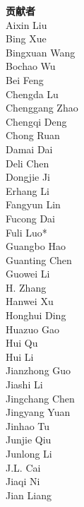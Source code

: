 \documentclass[11pt, a4paper, logo, copyright, nonumbering]{deepseek}
\begin{document}
\begin{multicols}{2}
\noindent
\textbf{\color{damaiblue} 贡献者} \\
\color{damaiblue}
\color{damaiblue} Aixin Liu \\
\color{damaiblue} Bing Xue \\
\color{damaiblue} Bingxuan Wang \\
\color{damaiblue} Bochao Wu \\
\color{damaiblue} Bei Feng \\
\color{damaiblue} Chengda Lu \\
\color{damaiblue} Chenggang Zhao \\
\color{damaiblue} Chengqi Deng \\
\color{damaiblue} Chong Ruan \\
\color{damaiblue} Damai Dai \\
\color{damaiblue} Deli Chen \\
\color{damaiblue} Dongjie Ji \\
\color{damaiblue} Erhang Li \\
\color{damaiblue} Fangyun Lin \\
\color{damaiblue} Fucong Dai \\
\color{damaiblue} Fuli Luo* \\
\color{damaiblue} Guangbo Hao \\
\color{damaiblue} Guanting Chen \\
\color{damaiblue} Guowei Li \\
\color{damaiblue} H. Zhang \\
\color{damaiblue} Hanwei Xu \\
\color{damaiblue} Honghui Ding \\
\color{damaiblue} Huazuo Gao \\
\color{damaiblue} Hui Qu \\
\color{damaiblue} Hui Li \\
\color{damaiblue} Jianzhong Guo \\
\color{damaiblue} Jiashi Li \\
\color{damaiblue} Jingchang Chen \\
\color{damaiblue} Jingyang Yuan \\
\color{damaiblue} Jinhao Tu \\
\color{damaiblue} Junjie Qiu \\
\color{damaiblue} Junlong Li \\
\color{damaiblue} J.L. Cai \\
\color{damaiblue} Jiaqi Ni \\
\color{damaiblue} Jian Liang \\

\end{multicols}
\end{document}
